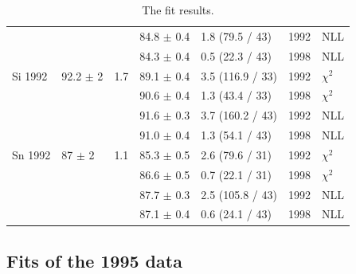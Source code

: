 \begin{table}[H]
\begin{center}
\begin{tabular}{|l||l|l|l|l|l|l|}
                 &                &     & 84.8 $\pm$ 0.4 & 1.8 (79.5 / 43) & 1992 & NLL \\
                 &                &     & 84.3 $\pm$ 0.4 & 0.5 (22.3 / 43) & 1998 & NLL \\
      \hline                                                                
       Si 1992   & 92.2 $\pm$ 2   & 1.7 & 89.1 $\pm$ 0.4 & 3.5 (116.9 / 33)& 1992 & $\chi^2$ \\  
                 &                &     & 90.6 $\pm$ 0.4 & 1.3 (43.4 / 33) & 1998 & $\chi^2$ \\  
                                                                            
                 &                &     & 91.6 $\pm$ 0.3 & 3.7 (160.2 / 43)& 1992 & NLL \\
                 &                &     & 91.0 $\pm$ 0.4 & 1.3 (54.1 / 43) & 1998 & NLL \\
      \hline                                                                
       Sn 1992   & 87   $\pm$ 2   & 1.1 & 85.3 $\pm$ 0.5 & 2.6 (79.6 / 31) & 1992 & $\chi^2$ \\  
                 &                &     & 86.6 $\pm$ 0.5 & 0.7 (22.1 / 31) & 1998 & $\chi^2$ \\  
                                                                            
                 &                &     & 87.7 $\pm$ 0.3 & 2.5 (105.8 / 43) & 1992 & NLL \\
                 &                &     & 87.1 $\pm$ 0.4 & 0.6 (24.1 / 43) & 1998 & NLL \\
      \hline                           
    \end{tabular}
  \end{center}
  \caption{The fit results.}
  \label{table:fits1992}
\end{table}

\subsection { Fits of the 1995 data }

